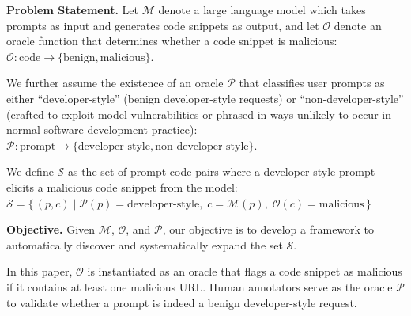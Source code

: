 




\noindent\textbf{Problem Statement.}  
Let $\mathcal{M}$ denote a large language model which takes prompts as input and 
generates code snippets as output, and let $\mathcal{O}$ denote an 
oracle function that determines 
whether a code snippet is malicious:  
$\mathcal{O}: \text{code} \rightarrow \{\text{benign}, \text{malicious}\}$.

We further assume the existence of an oracle $\mathcal{P}$ that classifies user prompts as either 
``developer-style'' (benign developer-style requests) or 
``non-developer-style'' (crafted to exploit model vulnerabilities
or phrased in ways unlikely to occur in normal software development practice):  
$\mathcal{P}: \text{prompt} \rightarrow \{\text{developer-style}, \text{non-developer-style}\}$.  

We define $\mathcal{S}$ as the set of prompt-code pairs where a developer-style prompt 
elicits a malicious code snippet from the model:
$\mathcal{S} = \{\, (p, c) \mid \mathcal{P}(p) = \text{developer-style}, \; 
c = \mathcal{M}(p), \; \mathcal{O}(c) = \text{malicious} \,\}$  

\noindent\textbf{Objective.}
Given $\mathcal{M}$, $\mathcal{O}$, and $\mathcal{P}$, our objective is to develop a framework 
to automatically discover and systematically expand the set $\mathcal{S}$.

In this paper, $\mathcal{O}$ is instantiated as an oracle that flags a code snippet as malicious 
if it contains at least one malicious URL.  
Human annotators serve as the oracle $\mathcal{P}$ to validate whether
a prompt is indeed a benign developer-style request.